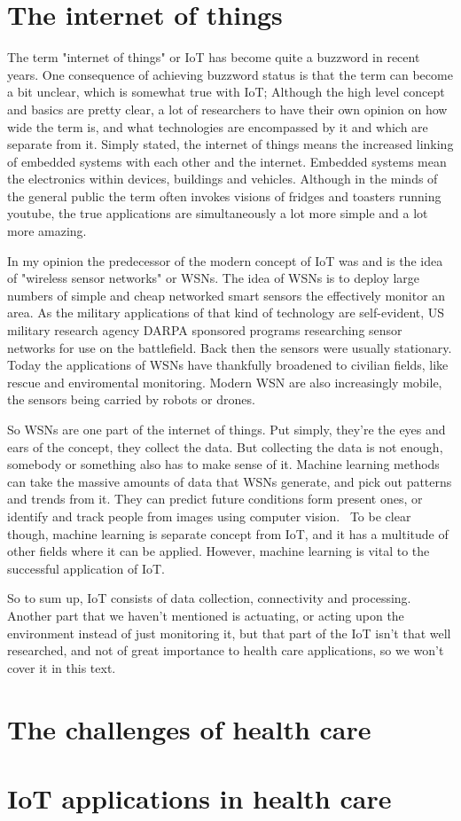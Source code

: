 \section{The internet of things}
\label{sec:iot}

The term "internet of things" or IoT has become quite a buzzword in recent
years. One consequence of achieving buzzword status is that the term can become
a bit unclear, which is somewhat true with IoT; Although the high level concept
and basics are pretty clear, a lot of researchers to have their own opinion on
how wide the term is, and what technologies are encompassed by it and which are
separate from it. Simply stated, the internet of things means the increased
linking of embedded systems with each other and the internet. Embedded systems
mean the electronics within devices, buildings and vehicles. Although in the
minds of the general public the term often invokes visions of fridges and
toasters running youtube, the true applications are simultaneously a lot more
simple and a lot more amazing.

In my opinion the predecessor of the modern concept of IoT was and is the idea
of "wireless sensor networks" or WSNs. The idea of WSNs is to deploy large
numbers of simple and cheap networked smart sensors the effectively monitor an
area. As the military applications of that kind of technology are self-evident,
US military research agency DARPA sponsored programs researching sensor
networks for use on the battlefield. Back then the sensors were usually
stationary. Today the applications of WSNs have thankfully broadened to
civilian fields, like rescue and enviromental monitoring. Modern WSN are also 
increasingly mobile, the sensors being carried by robots or
drones.~\cite{Chong2003}

So WSNs are one part of the internet of things. Put simply, they're the eyes
and ears of the concept, they collect the data. But collecting the data is not
enough, somebody or something also has to make sense of it. Machine learning
methods can take the massive amounts of data that WSNs generate, and pick out
patterns and trends from it. They can predict future conditions form present
ones, or identify and track people from images using computer
vision.~\cite{Gubbi2013} To be clear though, machine learning is separate
concept from IoT, and it has a multitude of other fields where it can be
applied. However, machine learning is vital to the successful application of
IoT.

So to sum up, IoT consists of data collection, connectivity and processing.
Another part that we haven't mentioned is actuating, or acting upon the
environment instead of just monitoring it, but that part of the IoT isn't that
well researched, and not of great importance to health care applications, so we
won't cover it in this text.

\section{The challenges of health care}
\label{sec:health}

\section{IoT applications in health care}
\label{sec:iot-health}
